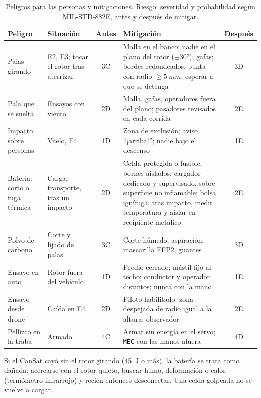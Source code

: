 \begin{table}[H]
\centering\footnotesize
\caption{Peligros para las personas y mitigaciones. Riesgo: severidad y probabilidad
según MIL-STD-882E, antes y después de mitigar.}
\label{tab:confiabilidad-peligros}
\begin{tabularx}{\textwidth}{@{}>{\raggedright\arraybackslash}p{2.5cm}>{\raggedright\arraybackslash}p{2.6cm}cYc@{}}
\toprule
\textbf{Peligro} & \textbf{Situación} & \textbf{Antes} & \textbf{Mitigación} & \textbf{Después}\\\midrule
Palas girando & E2, E3; tocar el rotor tras aterrizar & 3C & Malla en el banco; nadie en el plano del rotor ($\pm\ang{30}$); gafas; bordes redondeados, punta con radio $\ge\SI{5}{mm}$; esperar a que se detenga & 3D\\
Pala que se suelta & Ensayos con viento & 2D & Malla, gafas, operadores fuera del plano; pasadores revisados en cada corrida & 2E\\
Impacto sobre personas & Vuelo, E4 & 1D & Zona de exclusión; aviso ``¡arriba!''; nadie bajo el descenso & 1E\\
Batería: corto o fuga térmica & Carga, transporte, tras un impacto & 2D & Celda protegida o fusible; bornes aislados; cargador dedicado y supervisado, sobre superficie no inflamable; bolsa ignífuga; tras impacto, medir temperatura y aislar en recipiente metálico & 2E\\
Polvo de carbono & Corte y lijado de palas & 3C & Corte húmedo, aspiración, mascarilla FFP2, guantes & 3D\\
Ensayo en auto & Rotor fuera del vehículo & 1D & Predio cerrado; mástil fijo al techo; conductor y operador distintos; nunca con la mano & 1E\\
Ensayo desde drone & Caída en E4 & 2D & Piloto habilitado; zona despejada de radio igual a la altura; observador & 2E\\
Pellizco en la traba & Armado & 4C & Armar sin energía en el servo; \texttt{MEC} con las manos afuera & 4D\\
\bottomrule
\end{tabularx}
\end{table}

\begin{nota}
Si el CanSat cayó sin el rotor girando (\SI{45}{J} o más), la batería se trata como
dañada: acercarse con el rotor quieto, buscar humo, deformación o calor (termómetro
infrarrojo) y recién entonces desconectar. Una celda golpeada no se vuelve a cargar.
\end{nota}


